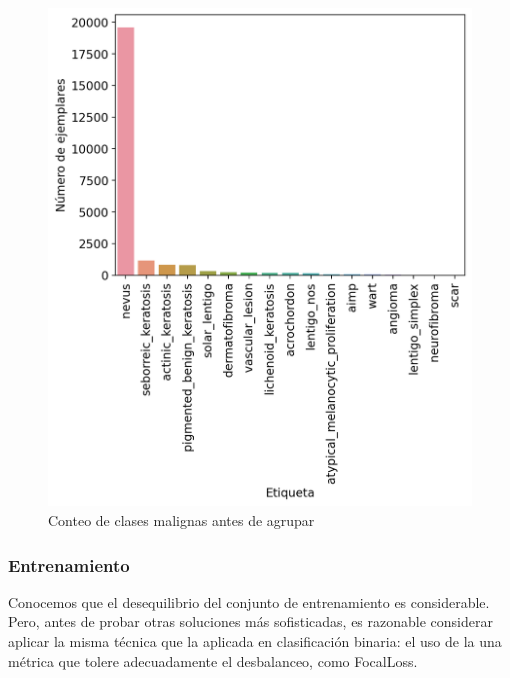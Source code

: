 \begin{figure}[H]
	\centering
	\includegraphics[scale = 0.5]{imagenes/countbenign.png}
	\caption{Conteo de clases malignas antes de agrupar}
	\label {fig:buenas}
\end{figure}

\subsubsection{Entrenamiento}

Conocemos que el desequilibrio del conjunto de entrenamiento es considerable. Pero, antes de probar otras soluciones más sofisticadas, es razonable considerar aplicar la misma técnica que la aplicada en clasificación binaria: el uso de la una métrica que tolere adecuadamente el desbalanceo, como FocalLoss.\\

